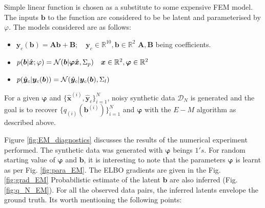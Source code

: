 \documentclass[a4paper,11pt]{article}
\begin{document}



Simple linear function is chosen as a substitute to some expensive FEM model. The inputs $\bm b$ to the function are considered to be be latent and parameterised by $\varphi$. The models considered are as follows:

\begin{itemize}
    \item $\bm{y}_c(\bm b) = \bm A \bm b + \bm B; \quad \bm{y}_c \in \mathbb{R}^{10}, \bm b \in \mathbb{R}^2$ \quad {} $\bm A, \bm B$ being coefficients. 
    \item $p(\boldsymbol{b} | \hat{\bm x}; \varphi) = \mathcal{N}(\boldsymbol{b}| \bm \varphi \hat{\bm x}, \Sigma_p) \quad \bm x \in \mathbb{R}^2, \bm \varphi \in \mathbb{R}^{2}$
    \item $p(\hat{\boldsymbol{y}}_c | \boldsymbol{y}_c(\boldsymbol{b})) = \mathcal{N}(\hat{\boldsymbol{y}}_c|\bm{y}_c(\bm b),\Sigma_l)$
\end{itemize}

For a given $\bm \varphi$ and $\{\hat{\bm x}^{(i)}, \hat{\bm y}_c\}_{i=1}^N$, noisy synthetic data $\mathcal{D}_N$ is generated and the goal is to recover $\{q_{(i)}(\bm b^{(i)})\}_{i=1}^{N}$ and $\bm \varphi$ with the $E-M$ algorithm as described above.

Figure \ref{fig:EM_diagnostics} discusses the results of the numerical experiment performed. The synthetic data was generated with $\bm \varphi$ beings $1's$. For random starting value of $\bm \varphi$ and $\bm b$, it is interesting to note that the parameters $\bm \varphi$ is learnt as per Fig. \ref{fig:para_EM}. The ELBO gradients are given in the Fig. \ref{fig:grad_EM} Probabilistic estimate of the latent $\bm b$ are also inferred (Fig. \ref{fig:q_N_EM}). For all the observed data pairs, the inferred latents envelope the ground truth. Its worth mentioning the following points:
\end{document}
